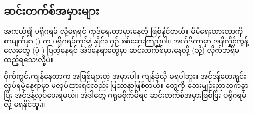 \clearpage
\subsection*{ဆင်းတက်စ်အမှားများ}
\begin{figure}[b!]
\caption{} 
\label{fig:sntxerr}
\end{figure}
အကယ်၍ ပရိုဂရမ်  လို့မရရင် ကုဒ်ရေးတာမှားနေလို့ ဖြစ်နိုင်တယ်။ မိမိရေးထားတာကို စာမျက်နှာ (\fRefNo{\pageref{lst:mtkrl}}) က ပရိုဂရမ်ကုဒ်နဲ့  နှိုင်းယှဉ် စစ်ဆေးကြည့်ပါ။  အယ်ဒီတာမှာ အနီလှိုင့်တွန့်လေးတွေ (ပုံ \fRefNo{\ref{fig:sntxerr}}) ပြတဲ့နေရင် အဲဒီနေရာတွေမှာ ဆင်းတက်စ်မှားနေလို့ (သို့) လိုက်ဘရီမထည့်ရသေးလို့ပဲ။

ဝိုက်ကွင်းကျန်နေတာက အဖြစ်များတဲ့ အမှားပါ။ ကျန်ခဲ့လို မရပါဘူး။ အင်ဒန့်တေးရှင်း  လုပ်ရမဲ့နေရာမှာ မလုပ်ထားရင်လည်း ပြဿနာဖြစ်တယ်။ \fEn{,}  တွေကို ဘေးမျဉ်းညာဘက်ခွာပြီး အင်ဒန့်လုပ်ပေးရမယ်။ အဲဒါတွေ ဂရုမစိုက်မိရင် ဆင်းတက်စ်အမှားဖြစ်ပြီး ပရိုဂရမ်  လို့ မရနိုင်ဘူး။

